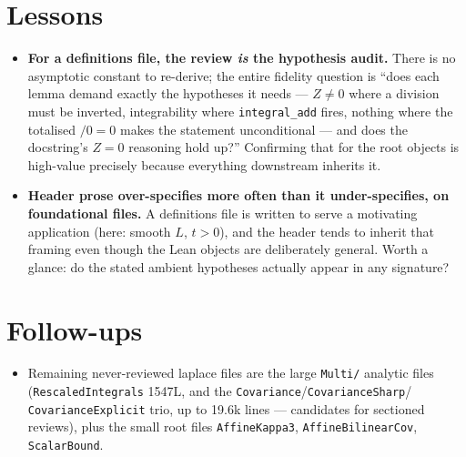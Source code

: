 \documentclass[11pt]{article}
\begin{document}
\section{Lessons}
\begin{itemize}[noitemsep]
  \item \textbf{For a definitions file, the review \emph{is} the hypothesis audit.} There is no
    asymptotic constant to re-derive; the entire fidelity question is ``does each lemma demand exactly
    the hypotheses it needs --- $Z\ne 0$ where a division must be inverted, integrability where
    \texttt{integral\_add} fires, nothing where the totalised $/0=0$ makes the statement unconditional
    --- and does the docstring's $Z=0$ reasoning hold up?'' Confirming that for the root objects is
    high-value precisely because everything downstream inherits it.
  \item \textbf{Header prose over-specifies more often than it under-specifies, on foundational
    files.} A definitions file is written to serve a motivating application (here: smooth $L$,
    $t>0$), and the header tends to inherit that framing even though the Lean objects are deliberately
    general. Worth a glance: do the stated ambient hypotheses actually appear in any signature?
\end{itemize}

\section{Follow-ups}
\begin{itemize}[noitemsep]
  \item Remaining never-reviewed laplace files are the large \texttt{Multi/} analytic files
    (\texttt{RescaledIntegrals} 1547L, and the \texttt{Covariance}/\texttt{CovarianceSharp}/
    \texttt{CovarianceExplicit} trio, up to 19.6k lines --- candidates for sectioned reviews), plus
    the small root files \texttt{AffineKappa3}, \texttt{AffineBilinearCov}, \texttt{ScalarBound}.
\end{itemize}
\end{document}
